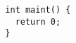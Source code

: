 \documentclass{article}
\begin{document}
\begin{verbatim}
  int maint() {
    return 0;
  }
\end{verbatim}
\end{document}
